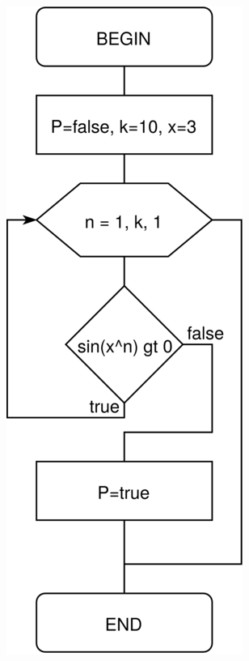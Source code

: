 \documentclass{article}
\begin{document}
\includegraphics[scale=0.5]{result/scheme.png}
\end{document}
